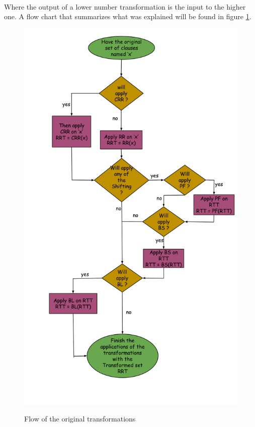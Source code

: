 		\paragraph{}			
		Where the output of a lower number transformation is the input to the higher one. A flow chart that summarizes what was explained will be found in figure \ref{fig:original_transformations_flow}.
		
		\begin{figure}[H]
			\centering
 		 	\scalebox{0.38}
 			{\includegraphics{pictures/Original_transformations_flow.png}}
 			\caption{Flow of the original transformations}\label{fig:original_transformations_flow}
		\end{figure}